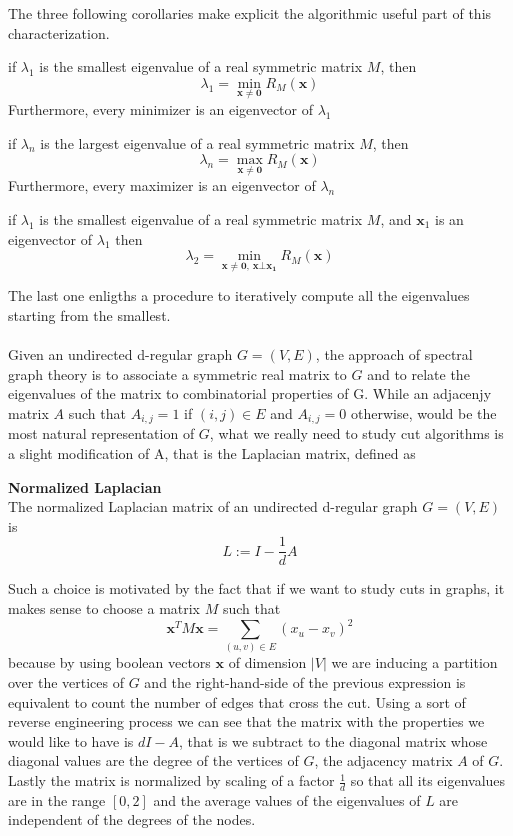 The three following corollaries make explicit the algorithmic useful part of this characterization.

\begin{corollary}
	if $ \lambda_1 $ is the smallest eigenvalue of a real symmetric matrix $ M $, then
	\[ \lambda_1 = \min_{\mathbf{x} \ne \mathbf{0}}R_M(\mathbf{x}) \]
	Furthermore, every minimizer is an eigenvector of $ \lambda_1 $
\end{corollary}

\begin{corollary}
	if $ \lambda_n $ is the largest eigenvalue of a real symmetric matrix $ M $, then
	\[ \lambda_n = \max_{\mathbf{x} \ne \mathbf{0}}R_M(\mathbf{x}) \]
	Furthermore, every maximizer is an eigenvector of $ \lambda_n $
\end{corollary}

\begin{corollary}
	if $ \lambda_1 $ is the smallest eigenvalue of a real symmetric matrix $ M $, and $ \mathbf{x}_1 $ is an eigenvector of $ \lambda_1 $ then
	\[ \lambda_2 = \min_{\mathbf{x} \ne \mathbf{0}, \, \mathbf{x} \bot \mathbf{x_1}} R_M(\mathbf{x})  \]
\end{corollary}

The last one enligths a procedure to iteratively compute all the eigenvalues starting from the smallest.
\\
\\
Given an undirected d-regular graph $G=(V,E)$, the approach of spectral graph theory is to associate a symmetric real matrix to $ G $ and to relate the eigenvalues of the matrix to combinatorial properties of G. While an adjacenjy matrix $ A $ such that $ A_{i,j}=1 $ if $ (i,j) \in E $ and $ A_{i,j}=0 $ otherwise, would be the most natural representation of $ G $, what we really need to study cut algorithms is a slight modification of A, that is the Laplacian matrix, defined as
\begin{definition}{\textbf{Normalized Laplacian}} \\
The normalized Laplacian matrix of an undirected d-regular graph $ G=(V,E)  $ is
\[L:= I-\frac{1}{d}A\]
\end{definition}
Such a choice is motivated by the fact that if we want to study cuts in graphs, it makes sense to choose a matrix $ M $ such that
\[\mathbf{x}^TM\mathbf{x} = \sum_{(u,v)\in E}(x_u-x_v)^2\]
because by using boolean vectors $ \mathbf{x} $ of dimension $ |V| $ we are inducing a partition over the vertices of $ G $ and the right-hand-side of the previous expression is equivalent to count the number of edges that cross the cut.
Using a sort of reverse engineering process we can see that the matrix with the properties we would like to have is $ dI-A $, that is we subtract to the diagonal matrix whose diagonal values are the degree of the vertices of $ G $, the adjacency matrix $ A $ of $ G $.
Lastly the matrix is normalized by scaling of a factor $ \frac{1}{d} $ so that all its eigenvalues are in the range $ [0,2] $ and the average values of the eigenvalues of $ L $ are independent of the degrees of the nodes.

